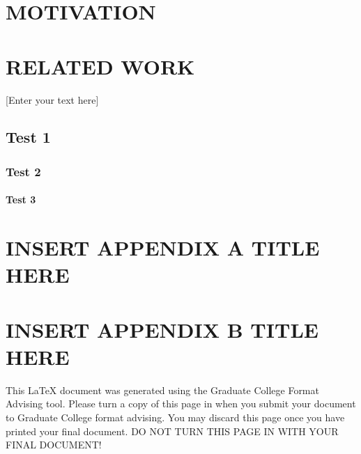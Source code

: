 \documentclass[oneside,11pt]{memoir}
\begin{document}
\chapter{MOTIVATION}
\DoubleSpacing
\setlength{\parindent}{.5in}




\chapter{RELATED WORK}

\DoubleSpacing
\setlength{\parindent}{.5in}
[Enter your text here]

\section{Test 1}
\subsection{Test 2}
\subsubsection{Test 3}



\vspace*{1in}
\begin{SingleSpace}
	

\end{SingleSpace}


\appendix
{}
\chapter{\uppercase{Insert Appendix A Title here}}
\clearpage
\chapter{\uppercase{Insert Appendix B Title here}}
\clearpage


This LaTeX document was generated using the Graduate College Format Advising tool. Please turn a copy of this page in when you submit your document to Graduate College format advising. You may discard this page once you have printed your final document. DO NOT TURN THIS PAGE IN WITH YOUR FINAL DOCUMENT!
\end{document}
